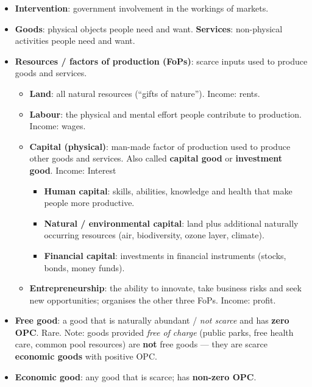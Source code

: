 \begin{itemize}
  \item \textbf{Intervention}: government involvement in the workings of markets.
  \item \textbf{Goods}: physical objects people need and want. \textbf{Services}: non-physical activities people need and want.
  \item \textbf{Resources / factors of production (FoPs)}: scarce inputs used to produce goods and services.
  \begin{itemize}
    \item \textbf{Land}: all natural resources (``gifts of nature''). Income: rents.
    \item \textbf{Labour}: the physical and mental effort people contribute to production. Income: wages.
    \item \textbf{Capital (physical)}: man-made factor of production used to produce other goods and services. Also called \textbf{capital good} or \textbf{investment good}. Income: Interest
    \begin{itemize}
      \item \textbf{Human capital}: skills, abilities, knowledge and health that make people more productive.
      \item \textbf{Natural / environmental capital}: land plus additional naturally occurring resources (air, biodiversity, ozone layer, climate).
      \item \textbf{Financial capital}: investments in financial instruments (stocks, bonds, money funds).
    \end{itemize}
    \item \textbf{Entrepreneurship}: the ability to innovate, take business risks and seek new opportunities; organises the other three FoPs. Income: profit.
  \end{itemize}
  \item \textbf{Free good}: a good that is naturally abundant / \textit{not scarce} and has \textbf{zero OPC}. Rare. Note: goods provided \textit{free of charge} (public parks, free health care, common pool resources) are \textbf{not} free goods --- they are scarce \textbf{economic goods} with positive OPC.
  \item \textbf{Economic good}: any good that is scarce; has \textbf{non-zero OPC}.
\end{itemize}

